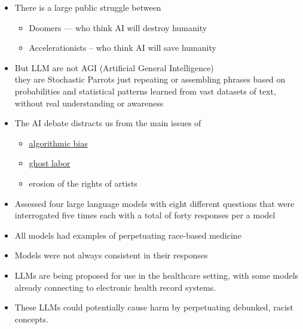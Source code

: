 \documentclass[25pt,a4paper,landscape,headrule,footrule,xetex]{foils}
\begin{document}

\begin{itemize}
\item There is a large public struggle between
  \begin{itemize}
  \item Doomers --- who think AI will destroy humanity
  \item Accelerationists -- who think AI will save humanity
  \end{itemize}
\item But LLM are not AGI (Artificial General Intelligence)
  \\ they are Stochastic Parrots just repeating or assembling phrases based on probabilities and statistical patterns learned from vast datasets of text, without real understanding or awareness \citep{10.1145/3442188.3445922}
\item The AI debate distracts us from the main issues of
  \begin{itemize}
  \item \href{https://en.wikipedia.org/wiki/Algorithmic_bias}{algorithmic bias}
  \item \href{https://en.wikipedia.org/wiki/Ghost_work}{ghost labor}
  \item erosion of the rights of artists
  \end{itemize}
\end{itemize}

\begin{itemize}
\item Assessed four large language models with eight different questions that were
interrogated five times each with a total of forty responses per a model
\item All models had examples
of perpetuating race-based medicine
\item Models were not always consistent in
their responses 
\item  LLMs are being proposed for use in the healthcare setting, with
some models already connecting to electronic health record systems. 
\item These LLMs could potentially cause harm by perpetuating debunked,
racist concepts. 
\end{itemize}
\end{document}
